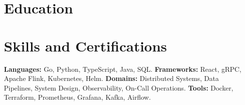 \documentclass[11pt,a4paper]{article}
\begin{document}
\section*{Education}

\noindent{}

\section*{Skills and Certifications}

\noindent\textbf{Languages:} Go, Python, TypeScript, Java, SQL. \textbf{Frameworks:} React, gRPC, Apache Flink, Kubernetes, Helm. \textbf{Domains:} Distributed Systems, Data Pipelines, System Design, Observability, On-Call Operations. \textbf{Tools:} Docker, Terraform, Prometheus, Grafana, Kafka, Airflow.
\end{document}

